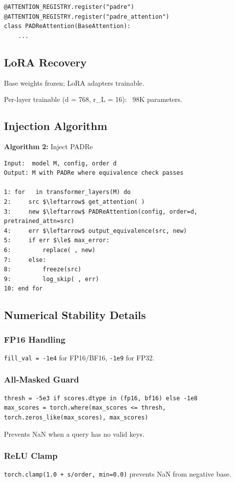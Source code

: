 \begin{lstlisting}
@ATTENTION_REGISTRY.register("padre")
@ATTENTION_REGISTRY.register("padre_attention")
class PADReAttention(BaseAttention):
    ...
\end{lstlisting}

\subsection{LoRA Recovery}

Base weights frozen; LoRA adapters trainable.

Per-layer trainable (d = 768, r\_L = 16): ~98K parameters.

\subsection{Injection Algorithm}

\textbf{Algorithm 2:} Inject PADRe
\begin{lstlisting}
Input:  model M, config, order d
Output: M with PADRe where equivalence check passes

1: for   in transformer_layers(M) do
2:     src $\leftarrow$ get_attention( )
3:     new $\leftarrow$ PADReAttention(config, order=d, pretrained_attn=src)
4:     err $\leftarrow$ output_equivalence(src, new)
5:     if err $\le$ max_error:
6:         replace( , new)
7:     else:
8:         freeze(src)
9:         log_skip( , err)
10: end for
\end{lstlisting}

\subsection{Numerical Stability Details}

\subsubsection{FP16 Handling}

\texttt{fill\_val = -1e4} for FP16/BF16, \texttt{-1e9} for FP32.

\subsubsection{All-Masked Guard}

\begin{lstlisting}
thresh = -5e3 if scores.dtype in (fp16, bf16) else -1e8
max_scores = torch.where(max_scores <= thresh, torch.zeros_like(max_scores), max_scores)
\end{lstlisting}

Prevents NaN when a query has no valid keys.

\subsubsection{ReLU Clamp}

\texttt{torch.clamp(1.0 + s/order, min=0.0)} prevents NaN from negative base.

